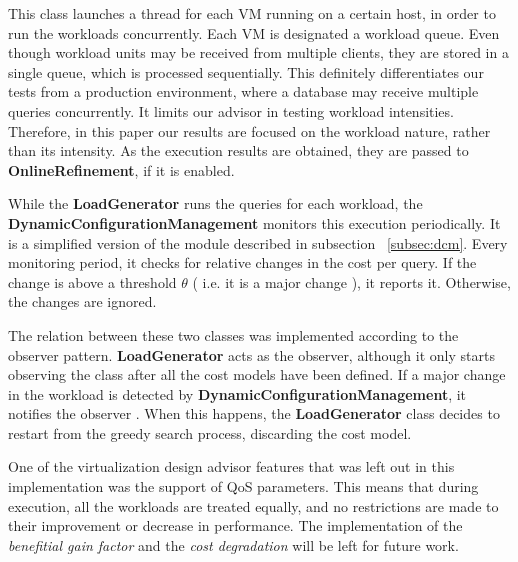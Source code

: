 This class launches a thread for each VM running on a certain host, in order to run the workloads concurrently. Each VM is designated a workload queue. Even though workload units may be received from multiple clients, they are stored in a single queue, which is processed sequentially. This definitely differentiates our tests from a production environment, where a database may receive multiple queries concurrently. It limits our advisor in testing workload intensities. Therefore, in this paper our results are focused on the workload nature, rather than its intensity. As the execution results are obtained, they are passed to \textbf{OnlineRefinement}, if it is enabled. 

While the \textbf{LoadGenerator} runs the queries for each workload, the \textbf{DynamicConfigurationManagement} monitors this execution periodically. 
It is a simplified version of the module described in subsection ~\ref{subsec:dcm}. Every monitoring period, it checks for relative changes in the cost per query. If the change is above a threshold $\theta$ ( i.e. it is a major change ), it reports it. Otherwise, the changes are ignored.

The relation between these two classes was implemented according to the observer pattern. \textbf{LoadGenerator} acts as the observer, although it only starts observing the class after all the cost models have been defined. If a major change in the workload is detected by \textbf{DynamicConfigurationManagement}, it notifies the observer . When this happens, the \textbf{LoadGenerator} class decides to restart from the greedy search process, discarding the cost model.

One of the virtualization design advisor  features that was left out in this implementation was the support of QoS parameters. This means that during execution, all the workloads are treated equally, and no restrictions are made to their improvement or decrease in performance. The implementation of the \textit{benefitial gain factor} and the \textit{cost degradation} will be left for future work.





